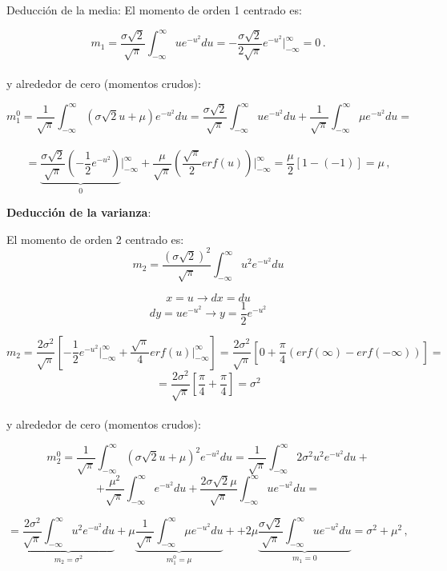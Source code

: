 \documentclass[
]{agujournal2019}
\begin{document}
Deducción de la media: El momento de orden 1 centrado es:

\[m_1=\frac{\sigma\sqrt{2}}{\sqrt{\pi}}\int^{\infty}_{-\infty}u{e}
   ^{-u^2}du=-\frac{\sigma\sqrt{2}}{2\sqrt{\pi}}{e}
   ^{-u^2}\Big|^{\infty}_{-\infty}=0\,.\]\\
y alrededor de cero (momentos crudos):

\[m^0_1=\frac{1}{\sqrt{\pi}}\int^{\infty}_{-\infty}(\sigma \sqrt{2} u + \mu){e}
   ^{-u^2}du=\frac{\sigma\sqrt{2}}{\sqrt{\pi}}\int^{\infty}_{-\infty}u{e}
   ^{-u^2}du + \frac{1}{\sqrt{\pi}}\int^{\infty}_{-\infty}\mu{ e}
   ^{-u^2}du=\]\\
\[=\underbrace{\frac{\sigma\sqrt{2}}{\sqrt{\pi}}\left( -\frac{1}{2}{ e}
   ^{-u^2}\right)}_{0} \Big|^{\infty}_{-\infty}+
   \frac{\mu}{\sqrt{\pi}}\left( \frac{\sqrt{\pi}}{2}{ erf}(u)\right) \Big|^{\infty}_{-\infty}=
   \frac{\mu}{2}[1-(-1)]=\mu\,,\]

\vspace{0.25cm}

\textbf{Deducción de la varianza}:

El momento de orden 2 centrado es:\\

\[m_2=\frac{(\sigma\sqrt{2})^2}{\sqrt{\pi}}\int^{\infty}_{-\infty}u^2{ e}^{-u^2}du\]

\[x=u \rightarrow dx=du\]
\[dy=u{ e}^{-u^2} \rightarrow y=\frac{1}{2}{ e}^{-u^2}\]

\[m_2=\frac{2\sigma^2}{\sqrt{\pi}}\left[ -\frac{1}{2}{ e}^{-u^2}
      \Big|^{\infty}_{-\infty} +\frac{\sqrt{\pi}}{4} { erf}(u)\Big|^{\infty}_{-\infty}\right]=
  \frac{2\sigma^2}{\sqrt{\pi}}\left[0 + \frac{\pi}{4}\left({ erf}(\infty) - { erf}(-\infty) \right)
  \right]=\]
\[=\frac{2\sigma^2}{\sqrt{\pi}}\left[ \frac{\pi}{4}+\frac{\pi}{4}\right]=\sigma^2\]\\

y alrededor de cero (momentos crudos):

\[m^0_2=\frac{1}{\sqrt{\pi}}\int^{\infty}_{-\infty}(\sigma \sqrt{2} u + \mu)^2{ e}^{-u^2}du=
   \frac{1}{\sqrt{\pi}}\int^{\infty}_{-\infty}2\sigma^2 u^2{ e}^{-u^2}du +\]
\[ +\frac{\mu^2}{\sqrt{\pi}}\int^{\infty}_{-\infty}{ e}^{-u^2}du
   +\frac{2\sigma\sqrt{2}\mu}{\sqrt{\pi}}\int^{\infty}_{-\infty}u{ e}^{-u^2}du=\]

\[
   =\underbrace{\frac{2\sigma^2}{\sqrt{\pi}}\int^{\infty}_{-\infty}u^2{ e}^{-u^2}du}_{m_2=\sigma^2}
   +\mu \underbrace{\frac{1}{\sqrt{\pi}}\int^{\infty}_{-\infty}\mu{ e}^{-u^2}du}_{m_1^0=\mu}+
   +2\mu \underbrace{\frac{\sigma\sqrt{2}}{\sqrt{\pi}}\int^{\infty}_{-\infty}u{ e}^{-u^2}du}_{m_1=0}= \sigma^2+\mu^2\,,\]\\
\end{document}
